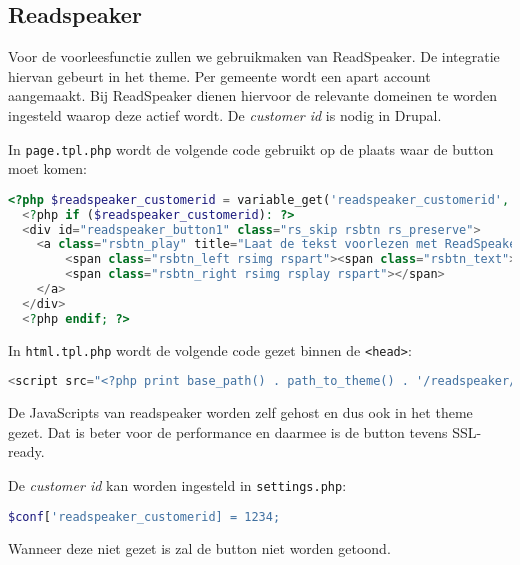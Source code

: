 \subsection{Readspeaker}\label{readspeaker}

Voor de voorleesfunctie zullen we gebruikmaken van ReadSpeaker. De integratie hiervan gebeurt in het theme. Per gemeente wordt een apart account aangemaakt. Bij ReadSpeaker dienen hiervoor de relevante domeinen te worden ingesteld waarop deze actief wordt. De \emph{customer id} is nodig in Drupal.

In \texttt{page.tpl.php} wordt de volgende code gebruikt op de plaats waar de button moet komen:

\begin{lstlisting}[language=PHP]
  <?php $readspeaker_customerid = variable_get('readspeaker_customerid', 0); ?>
  <?php if ($readspeaker_customerid): ?>
  <div id="readspeaker_button1" class="rs_skip rsbtn rs_preserve">
    <a class="rsbtn_play" title="Laat de tekst voorlezen met ReadSpeaker" href="//app.eu.readspeaker.com/cgi-bin/rsent?customerid=<?php print $readspeaker_customerid; ?>&amp;lang=nl_nl&amp;readid=main&amp;url=<?php echo urlencode($_SERVER['HTTP_HOST'] . $_SERVER['REQUEST_URI']); ?>">
        <span class="rsbtn_left rsimg rspart"><span class="rsbtn_text"><span>Lees voor</span></span></span>
        <span class="rsbtn_right rsimg rsplay rspart"></span>
    </a>
  </div>
  <?php endif; ?>
\end{lstlisting}

In \texttt{html.tpl.php} wordt de volgende code gezet binnen de \texttt{\textless head\textgreater}:
\begin{lstlisting}[language=PHP]
<script src="<?php print base_path() . path_to_theme() . '/readspeaker/ReadSpeaker.js?pids=embhl'; ?>"></script>
\end{lstlisting}

De JavaScripts van readspeaker worden zelf gehost en dus ook in het theme gezet. Dat is beter voor de performance en daarmee is de button tevens SSL-ready.

De \emph{customer id} kan worden ingesteld in \texttt{settings.php}:
\begin{lstlisting}[language=PHP]
$conf['readspeaker_customerid] = 1234;
\end{lstlisting}

Wanneer deze niet gezet is zal de button niet worden getoond.